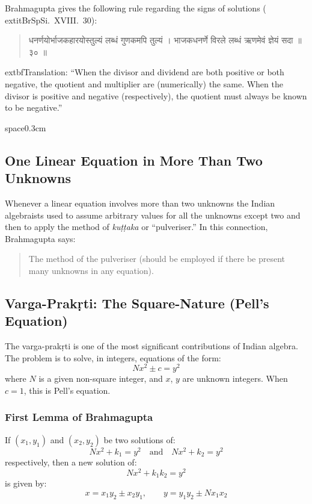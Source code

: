 \documentclass[11pt,a4paper]{article}
\newcommand{\dev}[1]{{\devanagarifont #1}}
\newenvironment{sanskritverse}{%
  \begin{quote}
  \devanagarifont
  \small
  \color{titlecolor}
}{\end{quote}}
\theoremstyle{definition}
\begin{document}
Brahmagupta gives the following rule regarding the signs of solutions (	extit{BrSpSi}.\ XVIII.\ 30):

\begin{sanskritverse}
\dev{धनर्णयोर्भाजकहारयोस्तुल्यं लब्धं गुणकमपि तुल्यं ।}
\dev{भाजकधनर्णे विरले लब्धं ऋणमेवं ज्ञेयं सदा ॥ ३० ॥}
\end{sanskritverse}

	extbf{Translation:} ``When the divisor and dividend are both positive or both negative, the quotient and multiplier are (numerically) the same. When the divisor is positive and negative (respectively), the quotient must always be known to be negative.''

space{0.3cm}

\subsection{One Linear Equation in More Than Two Unknowns}

Whenever a linear equation involves more than two unknowns the Indian algebraists used to assume arbitrary values for all the unknowns except two and then to apply the method of \textit{ku\d{t}\d{t}aka} or ``pulveriser.'' In this connection, Brahmagupta says:

\begin{quote}
The method of the pulveriser (should be employed if there be present many unknowns in any equation).
\end{quote}

\subsection{Varga-Prak\d{r}ti: The Square-Nature (Pell's Equation)}

The varga-prak\d{r}ti is one of the most significant contributions of Indian algebra. The problem is to solve, in integers, equations of the form:
\[
Nx^2 \pm c = y^2
\]
where $N$ is a given non-square integer, and $x$, $y$ are unknown integers. When $c = 1$, this is Pell's equation.

\subsubsection{First Lemma of Brahmagupta}

If $(x_1, y_1)$ and $(x_2, y_2)$ be two solutions of:
\[
Nx^2 + k_1 = y^2 \quad \text{and} \quad Nx^2 + k_2 = y^2
\]
respectively, then a new solution of:
\[
Nx^2 + k_1k_2 = y^2
\]
is given by:
\[
x = x_1y_2 \pm x_2y_1, \qquad y = y_1y_2 \pm Nx_1x_2
\]
\end{document}
